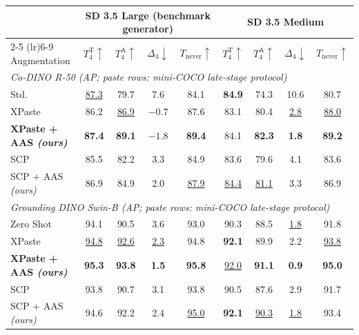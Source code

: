 \begin{tabular}{l cccc cccc}
\toprule
& \multicolumn{4}{c}{SD 3.5 Large (benchmark generator)} & \multicolumn{4}{c}{SD 3.5 Medium} \\
\cmidrule(lr){2-5} \cmidrule(lr){6-9}
Augmentation & $T_4^{\text{T}}\uparrow$ & $T_4^{\text{A}}\uparrow$ & $\Delta_4\downarrow$ & $T_{\text{never}}\uparrow$ & $T_4^{\text{T}}\uparrow$ & $T_4^{\text{A}}\uparrow$ & $\Delta_4\downarrow$ & $T_{\text{never}}\uparrow$ \\
\midrule
\multicolumn{9}{l}{\emph{Co-DINO R-50 (AP; paste rows: mini-COCO late-stage protocol)}} \\
Std. & \underline{87.3} & 79.7 & 7.6 & 84.1 & \textbf{84.9} & 74.3 & 10.6 & 80.7 \\
XPaste & 86.2 & \underline{86.9} & \underline{$-0.7$} & 87.6 & 83.1 & 80.4 & \underline{2.8} & \underline{88.0} \\
\rowcolor{oursrow} \textbf{XPaste + AAS \emph{(ours)}} & \textbf{87.4} & \textbf{89.1} & \textbf{\boldmath $-1.8$} & \textbf{89.4} & 84.1 & \textbf{82.3} & \textbf{1.8} & \textbf{89.2} \\
SCP & 85.5 & 82.2 & 3.3 & 84.9 & 83.6 & 79.6 & 4.1 & 83.6 \\
\rowcolor{oursrow} SCP + AAS \emph{(ours)} & 86.9 & 84.9 & 2.0 & \underline{87.9} & \underline{84.4} & \underline{81.1} & 3.3 & 86.9 \\
\midrule
\multicolumn{9}{l}{\emph{Grounding DINO Swin-B (AP; paste rows: mini-COCO late-stage protocol)}} \\
Zero Shot & 94.1 & 90.5 & 3.6 & 93.0 & 90.3 & 88.5 & \underline{1.8} & 91.8 \\
XPaste & \underline{94.8} & \underline{92.6} & \underline{2.3} & 94.8 & \textbf{92.1} & 89.9 & 2.2 & \underline{93.8} \\
\rowcolor{oursrow} \textbf{XPaste + AAS \emph{(ours)}} & \textbf{95.3} & \textbf{93.8} & \textbf{1.5} & \textbf{95.8} & \underline{92.0} & \textbf{91.1} & \textbf{0.9} & \textbf{95.0} \\
SCP & 93.8 & 90.7 & 3.1 & 93.8 & 90.5 & 87.6 & 2.9 & 91.7 \\
\rowcolor{oursrow} SCP + AAS \emph{(ours)} & 94.6 & 92.2 & 2.4 & \underline{95.0} & \textbf{92.1} & \underline{90.3} & \underline{1.8} & 93.4 \\
\bottomrule
\end{tabular}
